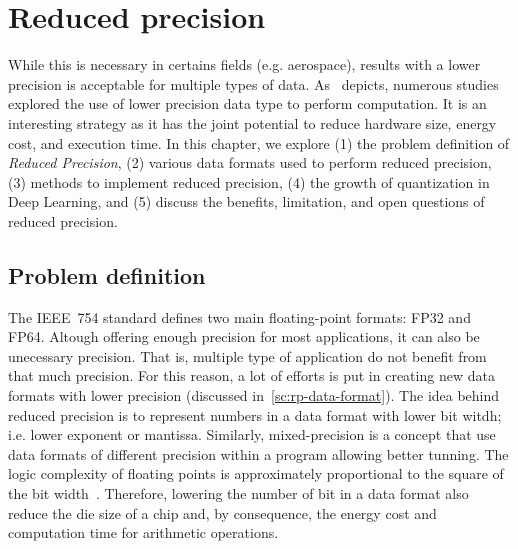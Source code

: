 \chapter{Reduced precision}
\label{ch:reduced-precision}
While this is necessary in certains fields (e.g. aerospace), results with a lower
precision is acceptable for multiple types of data.
As~\cite{Cherubin2020-tt} depicts, numerous studies explored the use of lower 
precision data type to perform computation.
It is an interesting strategy as it has the joint potential to reduce hardware 
size, energy cost, and execution time.
In this chapter, we explore (1) the problem definition of \textit{Reduced Precision},
(2) various data formats used to perform reduced precision,
(3) methods to implement reduced precision,
(4) the growth of quantization in Deep Learning,
and (5) discuss the benefits, limitation, and open questions of reduced precision.

\section{Problem definition}
\label{sc:rp-problem-definiton}
The IEEE~754 standard defines two main floating-point formats: FP32 and FP64.
Altough offering enough precision for most applications, it can also be unecessary precision.
That is, multiple type of application do not benefit from that much precision.
For this reason, a lot of efforts is put in creating new data formats with lower precision (discussed in~\ref{sc:rp-data-format}).
The idea behind reduced precision is to represent numbers in a data format with 
lower bit witdh; i.e. lower exponent or mantissa.
Similarly, mixed-precision is a concept that use data formats of different precision within a program allowing better tunning.
The logic complexity of floating points is approximately proportional to the square of the bit width~\cite{Chen2018-an}.
Therefore, lowering the number of bit in a data format also reduce the die size 
of a chip and, by consequence, the energy cost and computation time for arithmetic operations.

